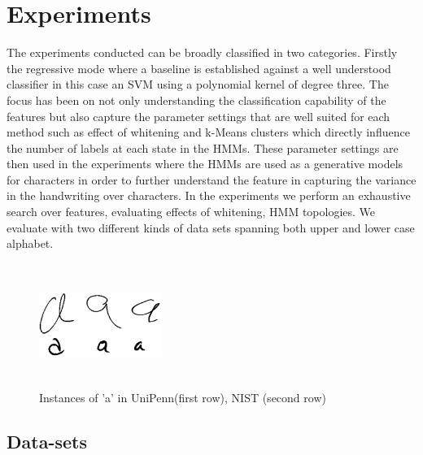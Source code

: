 \documentclass[runningheads]{llncs}
\begin{document}
\section{Experiments}
\label{sec:exp}
The experiments conducted can be broadly classified in two categories. Firstly the regressive mode where a baseline is established against a well understood classifier in this case an SVM using a polynomial kernel of degree three. The focus has been on not only understanding the classification capability of the features but also capture the parameter settings that are well suited for each method such as effect of whitening and k-Means clusters which directly influence the number of labels at each state in the HMMs. These parameter settings are then used in the experiments where the HMMs are used as a generative models for characters in order to further understand the feature in capturing the variance in the handwriting over characters. In the experiments we perform an exhaustive search over features, evaluating effects of whitening, HMM topologies. We evaluate with two different kinds of data sets spanning both upper and lower case alphabet.

\begin{figure}[t]

\begin{minipage}[b]{1.0\linewidth}
  \centering
  \centerline{\includegraphics[width=4.0cm,height=4.0cm]{data}}
\end{minipage}
\caption{Instances of 'a' in UniPenn(first row), NIST (second row)}
\label{fig:dataset}
%
\end{figure}

\subsection{Data-sets}
\label{ssec:data}
\end{document}
